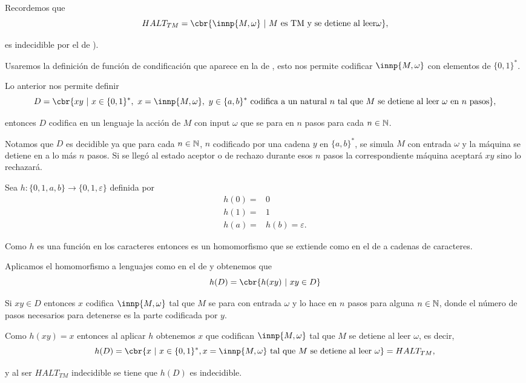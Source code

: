 \documentclass{article}
\begin{document}
\Proof 
Recordemos que 
\[
    HALT_{TM}=\cbr{\innp{M,\omega}\ |\ M\text{ es TM y se detiene al leer} \omega},
\]

es indecidible por el  de \cite{sipser}).

Usaremos la definición de función de condificación que aparece en la  de \cite{martin}, esto nos permite codificar $\innp{M,\omega}$ con elementos de $\{0,1\}^{\ast}$.

Lo anterior nos permite definir 
\[
    D=\cbr{xy\ |\ x\in \{0,1\}^*,\ x=\innp{M,\omega},\ y\in \{a,b\}^*\text{ codifica a un natural } n\text{ tal que } M\text{ se detiene al leer }\omega \text{ en }n\text{ pasos}},
\]

entonces $D$ codifica en un lenguaje la acción de $M$ con input $\omega$ que se para en $n$ pasos para cada $n\in\N$.

Notamos que $D$ es decidible ya que para cada $n\in\N$, $n$ codificado por una cadena $y$ en $\{a,b\}^*$, se simula $M$ con entrada $\omega$ y la máquina se detiene en a lo más $n$ pasos. Si se llegó al estado aceptor o de rechazo durante esos $n$ pasos la correspondiente máquina aceptará $xy$ sino lo rechazará.

Sea $h:\{0,1,a,b\}\rightarrow \{0,1,\varepsilon\}$ definida por 
\begin{align*}
    h(0)=&0\\ 
    h(1)=&1\\ 
    h(a)=&h(b)=\varepsilon.
\end{align*}

Como $h$ es una función en los caracteres entonces es un homomorfismo que se extiende como en el  de \cite{sipser} a cadenas de caracteres. 

Aplicamos el homomorfismo a lenguajes como en el  de \cite{sipser} y obtenemos que 
\[
    h(D)=\cbr{h(xy)\ |\ xy\in D}
\]

Si $xy\in D$ entonces $x$ codifica $\innp{M,\omega}$ tal que $M$ se para con entrada $\omega$ y lo hace en $n$ pasos para alguna $n\in\N$, donde el número de pasos necesarios para detenerse es la parte codificada por $y$. 

Como $h(xy)=x$ entonces al aplicar $h$ obtenemos $x$ que codifican $\innp{M,\omega}$ tal que $M$ se detiene al leer $\omega$, es decir,
\[
    h(D)=\cbr{x\ |\ x\in \{0,1\}^{\ast}, x=\innp{M,\omega}\text{ tal que }M\text{ se detiene al leer }\omega}=HALT_{TM},
\]

y al ser $HALT_{TM}$ indecidible se tiene que $h(D)$ es indecidible. 
\end{document}
